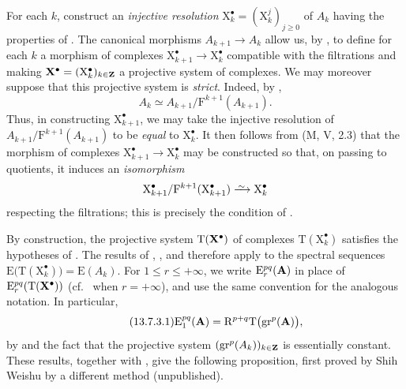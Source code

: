 \begin{env}[13.7.2]
\label{0.13.7.2}
For each $k$, construct an \emph{injective resolution}
$\mathrm{X}_k^\bullet=(\mathrm{X}_k^j)_{j\geq0}$ of $A_k$ having the
properties of .
The canonical morphisms $A_{k+1}\longrightarrow A_k$ allow us, by
, to define for each $k$ a morphism of complexes $\mathrm{X}_{k+1}^\bullet\longrightarrow\mathrm{X}_k^\bullet$
compatible with the filtrations and making
$\mathbf{X}^\bullet=(\mathrm{X}_k^\bullet)_{k\in\mathbf{Z}}$ a projective
system of complexes.
We may moreover suppose that this projective system is \emph{strict}.
Indeed, by ,
\[
  A_k
  \simeq
  A_{k+1}/\mathrm{F}^{k+1}(A_{k+1}).
\]
Thus, in constructing $\mathrm{X}_{k+1}^\bullet$, we may take the
injective resolution of
$A_{k+1}/\mathrm{F}^{k+1}(A_{k+1})$ to be
\emph{equal} to $\mathrm{X}_k^\bullet$.
It then follows from (M, V, 2.3) that the morphism of complexes
$\mathrm{X}_{k+1}^\bullet\longrightarrow\mathrm{X}_k^\bullet$ may be
constructed so that, on passing to quotients, it induces an
\emph{isomorphism}
\[
  \mathrm{X}_{k+1}^\bullet/
  \mathrm{F}^{k+1}(\mathrm{X}_{k+1}^\bullet)
  \simto
  \mathrm{X}_k^\bullet
\]
respecting the filtrations; this is precisely the condition of
.
\end{env}

\begin{env}[13.7.3]
\label{0.13.7.3}
By construction, the projective system
$\mathrm{T}(\mathbf{X}^\bullet)$ of complexes
$\mathrm{T}(\mathrm{X}_k^\bullet)$ satisfies the hypotheses of
.
The results of , , and
 therefore apply to the spectral sequences $\mathrm{E}\bigl(\mathrm{T}(\mathrm{X}_k^\bullet)\bigr)
=
\mathrm{E}(A_k)$.
For $1\leq r\leq+\infty$, we write
$\mathrm{E}_r^{pq}(\mathbf{A})$ in place of
$\mathrm{E}_r^{pq}(\mathrm{T}(\mathbf{X}^\bullet))$
(cf.\  when $r=+\infty$), and use the same convention
for the analogous notation.
In particular,
\begin{equation}
\label{0.13.7.3.1}
\tag{13.7.3.1}
  \mathrm{E}_1^{pq}(\mathbf{A})
  =
  \mathrm{R}^{p+q}\mathrm{T}\bigl(\mathrm{gr}^p(\mathbf{A})\bigr),
\end{equation}
by  and the fact that the projective system
$(\mathrm{gr}^p(A_k))_{k\in\mathbf{Z}}$ is essentially constant.
These results, together with , give the following
proposition, first proved by Shih Weishu by a different method
(unpublished).
\end{env}

